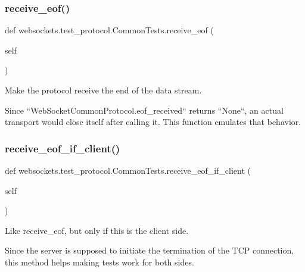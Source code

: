 \subsubsection{\texorpdfstring{receive\+\_\+eof()}{receive\_eof()}}
{\footnotesize\ttfamily def websockets.\+test\+\_\+protocol.\+Common\+Tests.\+receive\+\_\+eof (\begin{DoxyParamCaption}\item[{}]{self }\end{DoxyParamCaption})}

\begin{DoxyVerb}Make the protocol receive the end of the data stream.

Since ``WebSocketCommonProtocol.eof_received`` returns ``None``, an
actual transport would close itself after calling it. This function
emulates that behavior.\end{DoxyVerb}
 \mbox{\label{classwebsockets_1_1test__protocol_1_1_common_tests_af1c2c7d113da9e0c81657606142b9ee7}} 
\subsubsection{\texorpdfstring{receive\+\_\+eof\+\_\+if\+\_\+client()}{receive\_eof\_if\_client()}}
{\footnotesize\ttfamily def websockets.\+test\+\_\+protocol.\+Common\+Tests.\+receive\+\_\+eof\+\_\+if\+\_\+client (\begin{DoxyParamCaption}\item[{}]{self }\end{DoxyParamCaption})}

\begin{DoxyVerb}Like receive_eof, but only if this is the client side.

Since the server is supposed to initiate the termination of the TCP
connection, this method helps making tests work for both sides.\end{DoxyVerb}
 \mbox{\label{classwebsockets_1_1test__protocol_1_1_common_tests_a6452ee615a5c45fde6a0616f2a5e67f6}} 
